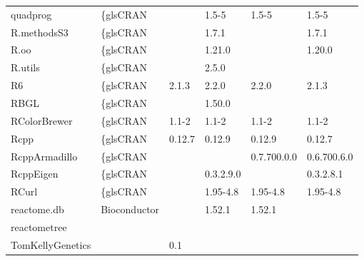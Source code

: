 \begin{longtable}{llllll}
\rowcolor{black!10}
quadprog                      & \{gls{CRAN}                      &             & 1.5-5       & 1.5-5          & 1.5-5             \\
\rowcolor{black!5}
R.methodsS3                   & \{gls{CRAN}                      &             & 1.7.1       &                & 1.7.1              \\
\rowcolor{black!10}
R.oo                          & \{gls{CRAN}                      &             & 1.21.0      &                & 1.20.0            \\
\rowcolor{black!5}
R.utils                       & \{gls{CRAN}                      &             & 2.5.0       &                &                    \\
\rowcolor{black!10}
R6                            & \{gls{CRAN}                      & 2.1.3       & 2.2.0       & 2.2.0          & 2.1.3             \\
\rowcolor{black!5}
RBGL                          & \{gls{CRAN}                      &             & 1.50.0      &                &                    \\
\rowcolor{black!10}
RColorBrewer                  & \{gls{CRAN}                      & 1.1-2       & 1.1-2       & 1.1-2          & 1.1-2             \\
\rowcolor{black!5}
Rcpp                          & \{gls{CRAN}                      & 0.12.7      & 0.12.9      & 0.12.9         & 0.12.7             \\
\rowcolor{black!10}
RcppArmadillo                 & \{gls{CRAN}                      &             &             & 0.7.700.0.0    & 0.6.700.6.0       \\
\rowcolor{black!5}
RcppEigen                     & \{gls{CRAN}                      &             & 0.3.2.9.0   &                & 0.3.2.8.1          \\
\rowcolor{black!10}
RCurl                         & \{gls{CRAN}                      &             & 1.95-4.8    & 1.95-4.8       & 1.95-4.8          \\
\rowcolor{black!5}
reactome.db                   & Bioconductor              &             & 1.52.1      & 1.52.1         &                    \\
\rowcolor{black!10}
reactometree                  & \begin{tabular}[c]{@{}l@{}}GitHub \\ TomKellyGenetics \end{tabular}  &             & 0.1         &                &                   \\

\end{longtable}

